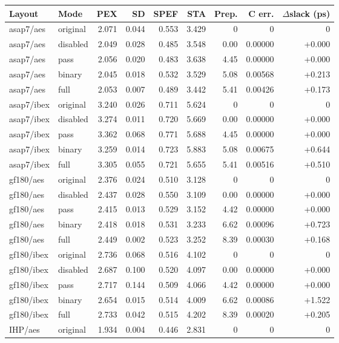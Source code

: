 \begin{tabular}{llrrrrrrr}
\toprule
Layout & Mode & PEX & SD & SPEF & STA & Prep. & C err. & $\Delta$slack (ps) \\
\midrule
asap7/aes & original & 2.071 & 0.044 & 0.553 & 3.429 & 0 & 0 & 0 \\
asap7/aes & disabled & 2.049 & 0.028 & 0.485 & 3.548 & 0.00 & 0.00000 & +0.000 \\
asap7/aes & pass & 2.056 & 0.020 & 0.483 & 3.638 & 4.45 & 0.00000 & +0.000 \\
asap7/aes & binary & 2.045 & 0.018 & 0.532 & 3.529 & 5.08 & 0.00568 & +0.213 \\
asap7/aes & full & 2.053 & 0.007 & 0.489 & 3.442 & 5.41 & 0.00426 & +0.173 \\
asap7/ibex & original & 3.240 & 0.026 & 0.711 & 5.624 & 0 & 0 & 0 \\
asap7/ibex & disabled & 3.274 & 0.011 & 0.720 & 5.669 & 0.00 & 0.00000 & +0.000 \\
asap7/ibex & pass & 3.362 & 0.068 & 0.771 & 5.688 & 4.45 & 0.00000 & +0.000 \\
asap7/ibex & binary & 3.259 & 0.014 & 0.723 & 5.883 & 5.08 & 0.00675 & +0.644 \\
asap7/ibex & full & 3.305 & 0.055 & 0.721 & 5.655 & 5.41 & 0.00516 & +0.510 \\
gf180/aes & original & 2.376 & 0.024 & 0.510 & 3.128 & 0 & 0 & 0 \\
gf180/aes & disabled & 2.437 & 0.028 & 0.550 & 3.109 & 0.00 & 0.00000 & +0.000 \\
gf180/aes & pass & 2.415 & 0.013 & 0.529 & 3.152 & 4.42 & 0.00000 & +0.000 \\
gf180/aes & binary & 2.418 & 0.018 & 0.531 & 3.233 & 6.62 & 0.00096 & +0.723 \\
gf180/aes & full & 2.449 & 0.002 & 0.523 & 3.252 & 8.39 & 0.00030 & +0.168 \\
gf180/ibex & original & 2.736 & 0.068 & 0.516 & 4.102 & 0 & 0 & 0 \\
gf180/ibex & disabled & 2.687 & 0.100 & 0.520 & 4.097 & 0.00 & 0.00000 & +0.000 \\
gf180/ibex & pass & 2.717 & 0.144 & 0.509 & 4.066 & 4.42 & 0.00000 & +0.000 \\
gf180/ibex & binary & 2.654 & 0.015 & 0.514 & 4.009 & 6.62 & 0.00086 & +1.522 \\
gf180/ibex & full & 2.733 & 0.042 & 0.515 & 4.202 & 8.39 & 0.00020 & +0.205 \\
IHP/aes & original & 1.934 & 0.004 & 0.446 & 2.831 & 0 & 0 & 0 \\

\end{tabular}
